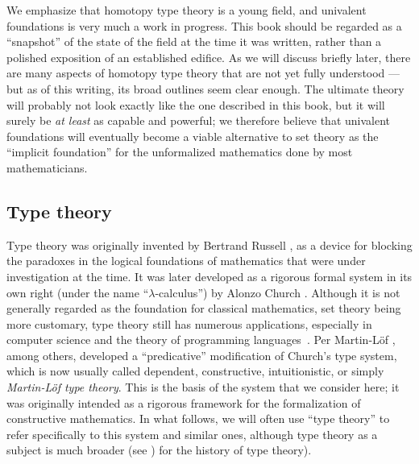 
We emphasize that homotopy type theory is a young field, and univalent foundations is very much a work in progress.
This book should be regarded as a ``snapshot'' of the state of the field at the time it was written, rather than a polished exposition of an established edifice.
As we will discuss briefly later, there are many aspects of homotopy type theory that are not yet fully understood --- but as of this writing, its broad outlines seem clear enough.
The ultimate theory will probably not look exactly like the one described in this book, but it will surely be \emph{at least} as capable and powerful; we therefore believe that univalent foundations will eventually become a viable alternative to set theory as the ``implicit foundation'' for the unformalized mathematics done by most mathematicians.

\subsection{Type theory}

Type theory was originally invented by Bertrand Russell \citep{Russell:1908}, as a device for blocking the paradoxes in the logical foundations of mathematics  that were under investigation at the time. It was later developed as a rigorous formal system in its own right (under the name ``$\lambda$-calculus'') by Alonzo Church \citep{Church:1933cl,Church:1940tu,Church:1941tc}.  Although it is not generally regarded as the foundation for classical mathematics, set theory being more customary, type theory still has numerous applications, especially in computer science and the theory of programming languages~\citep{Pierce-TAPL}.
Per Martin-L\"{o}f %
\citep{Martin-Lof-1972,Martin-Lof-1973,Martin-Lof-1979,martin-lof:bibliopolis},
 among others,
developed a ``predicative'' modification of Church's type system, which is now usually called dependent, constructive, intuitionistic, or simply \emph{Martin\--L\"of type theory}. This is the basis of the system that we consider here; it was originally intended as a rigorous framework for the formalization of constructive mathematics.  In what follows, we will often use ``type theory'' to refer specifically to this system and similar ones, although type theory as a subject is much broader (see \citep{somma,kamar})
 for the history of type theory).

